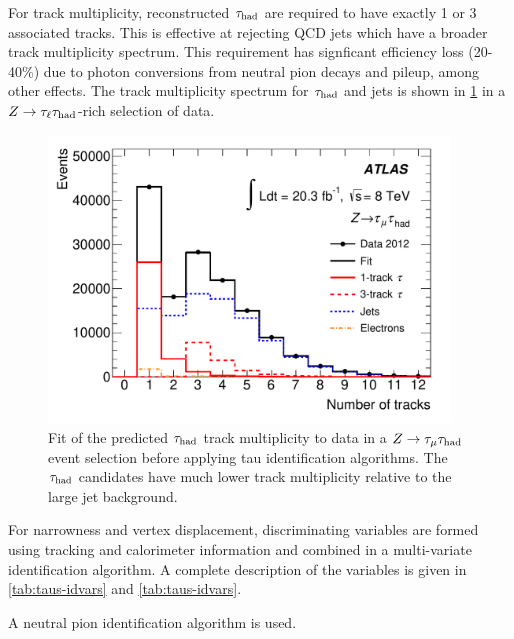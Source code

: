 For track multiplicity, reconstructed $\tau_\text{had}$ are required to have exactly 1 or 3 associated tracks. This is effective at rejecting QCD jets which have a broader track multiplicity spectrum. This requirement has signficant efficiency loss (20-40\%) due to photon conversions from neutral pion decays and pileup, among other effects. The track multiplicity spectrum for $\tau_\text{had}$ and jets is shown in \cref{fig:taus-trackmultiplicity} in a $Z\rightarrow\tau_\ell\tau_\text{had}$-rich selection of data.

\begin{figure}[tp]
  \centering
  \includegraphics[width=0.95\textwidth]{figures/PERF-2013-06/fig_10a}
  \caption{Fit of the predicted $\tau_\text{had}$ track multiplicity to data in a $Z\rightarrow\tau_\mu \tau_\text{had}$ event selection before applying tau identification algorithms. The $\tau_\text{had}$ candidates have much lower track multiplicity relative to the large jet background.}
  \label{fig:taus-trackmultiplicity}
\end{figure}

For narrowness and vertex displacement, discriminating variables are formed using tracking and calorimeter information and combined in a multi-variate identification algorithm. A complete description of the variables is given in \cref{tab:taus-idvars} and \cref{tab:taus-idvars}.

A neutral pion identification algorithm is used.

